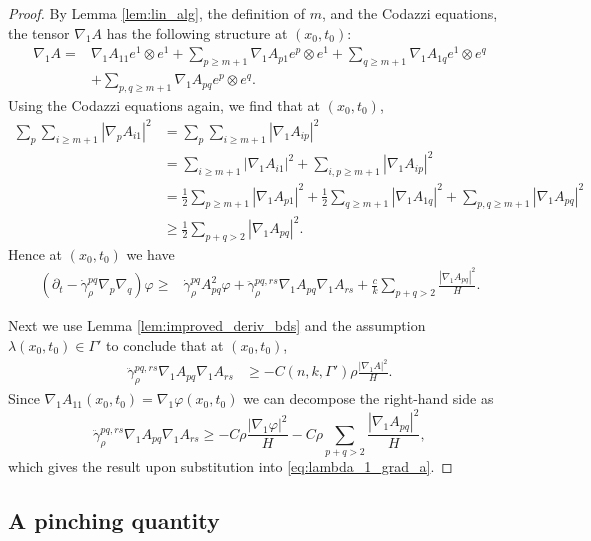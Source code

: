 \documentclass[12pt]{amsart}
\begin{document}
\begin{proof}
By Lemma \ref{lem:lin_alg}, the definition of $m$, and the Codazzi equations, the tensor $\nabla_1 A$ has the following structure at $(x_0,t_0)$:
\begin{align*}
\nabla_1 A = & \nabla_1 A_{11} e^1 \otimes e^1 + \sum_{p \geq m+1} \nabla_1 A_{p1} e^p \otimes e^1 + \sum_{q \geq m+1} \nabla_1 A_{1q} e^1 \otimes e^q\\
&+ \sum_{p,q\geq m+1} \nabla_1 A_{pq} e^p \otimes e^q.
\end{align*}
Using the Codazzi equations again, we find that at $(x_0,t_0)$,
\begin{align*}
\sum_p \sum_{i \geq m+1 } |\nabla_p A_{i1}|^2 &= \sum_p \sum_{i \geq m+1} |\nabla_1 A_{ip}|^2\\
&=\sum_{i \geq m+1} |\nabla_1 A_{i1}|^2 +\sum_{i,p \geq m+1 } |\nabla_1 A_{ip}|^2 \\
&= \frac{1}{2} \sum_{p \geq m+1} |\nabla_1 A_{p1}|^2 + \frac{1}{2} \sum_{q \geq m+1} |\nabla_1 A_{1q}|^2 + \sum_{p,q \geq m+1} |\nabla_1 A_{pq}|^2\\
& \geq \frac{1}{2}\sum_{p+q > 2} |\nabla_1 A_{pq}|^2 .
\end{align*}
Hence at $(x_0,t_0)$ we have
 \begin{align}
 \label{eq:lambda_1_grad_a}
(\partial_t - \dot \gamma_\rho^{pq} \nabla_p \nabla_q) \varphi \geq& \dot \gamma_\rho^{pq}  A^2_{pq} \varphi  + \ddot \gamma_\rho^{pq,rs} \nabla_1 A_{pq} \nabla_1 A_{rs}+ \frac{c}{k}\sum_{p+q > 2} \frac{|\nabla_1 A_{pq}|^2}{H} .
\end{align}

Next we use Lemma \ref{lem:improved_deriv_bds} and the assumption $\lambda(x_0,t_0) \in \Gamma'$ to conclude that at $(x_0,t_0)$,
\begin{align*}
\ddot \gamma_\rho^{pq,rs} \nabla_1 A_{pq} \nabla_1 A_{rs} &\geq - C(n,k,\Gamma')\rho \frac{|\nabla_1 A|^2}{H}.
\end{align*}
Since $\nabla_1 A_{11}(x_0,t_0) = \nabla_1 \varphi(x_0,t_0)$ we can decompose the right-hand side as 
\[\ddot \gamma_\rho^{pq,rs} \nabla_1 A_{pq} \nabla_1 A_{rs} \geq - C\rho \frac{|\nabla_1 \varphi|^2}{H} - C\rho \sum_{p+q > 2} \frac{|\nabla_1 A_{pq}|^2}{H},\]
which gives the result upon substitution into \eqref{eq:lambda_1_grad_a}.
\end{proof}


\subsection{A pinching quantity}
\label{sec:pinching_quantity}
\end{document}
